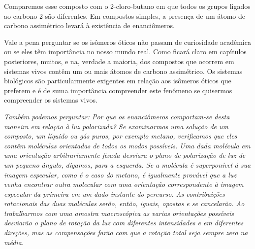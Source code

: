 \begin{figure}[H]
    \centering
\end{figure}

\noindent Comparemos esse composto com o 2-cloro-butano em que todos os grupos ligados ao carbono 2 são diferentes. Em compostos simples, a presença de um átomo de carbono assimétrico levará à existência de enanciômeros.

Vale a pena perguntar se os isômeros óticos não passam de curiosidade acadêmica ou se eles têm importância no nosso mundo real. Como ficará claro em capítulos posteriores, muitos, e na, verdade a maioria, dos compostos que ocorrem em sistemas vivos contêm um ou mais átomos de carbono assimétrico. Os sistemas biológicos são particularmente exigentes em relação aos isômeros óticos que preferem e é de suma importância compreender este fenômeno se quisermos compreender os sistemas vivos.

\noindent\emph{Também podemos perguntar: Por que os enanciômeros comportam-se desta maneira em relação à luz polarizada? Se examinarmos uma solução de um composto, um líquido ou gás puros, por exemplo metano, verificamos que eles contêm moléculas orientadas de todos os modos possíveis. Uma dada molécula em uma orientação arbitrariamente fixada desviara o plano de polarização de luz de um pequeno ângulo, digamos, para a esquerda. Se a molécula é superponível à sua imagem especular, como é o caso do metano, é igualmente provável que a luz venha encontrar outra molecular com uma orientação correspondente à imagem especular da primeira em um dado instante do percurso. As contribuições rotacionais das duas moléculas serão, então, iguais, opostas e se cancelarão. Ao trabalharmos com uma amostra macroscópica as varias orientações possíveis desviarão o plano de rotação da luz com diferentes intensidades e em diferentes direções, mas as compensações farão com que a rotação total seja sempre zero na média.}

